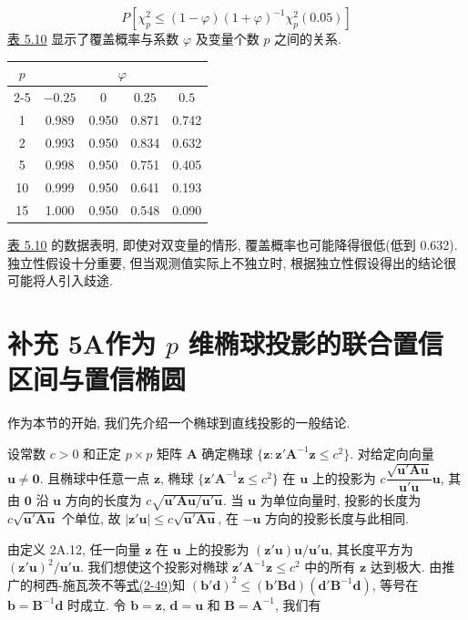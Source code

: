 \[
P\left[\chi_p^2\le(1-\varphi)(1+\varphi)^{-1}\chi_p^2(0.05)\right]
\]
\hyperref[tab:5.10]{表 5.10} 显示了覆盖概率与系数 $\varphi$ 及变量个数 $p$ 之间的关系.

\begin{mvtable}
\label{tab:5.10}
\begin{tabular}{ccccc}
\toprule
$p$ & \multicolumn{4}{c}{$\varphi$}\\
\cmidrule(lr){2-5}
& $-0.25$ & $0$ & $0.25$ & $0.5$\\
\midrule
1 & 0.989 & 0.950 & 0.871 & 0.742\\
2 & 0.993 & 0.950 & 0.834 & 0.632\\
5 & 0.998 & 0.950 & 0.751 & 0.405\\
10 & 0.999 & 0.950 & 0.641 & 0.193\\
15 & 1.000 & 0.950 & 0.548 & 0.090\\
\bottomrule
\end{tabular}
\end{mvtable}

\hyperref[tab:5.10]{表 5.10} 的数据表明, 即使对双变量的情形, 覆盖概率也可能降得很低(低到 0.632).
独立性假设十分重要, 但当观测值实际上不独立时, 根据独立性假设得出的结论很可能将人引入歧途.

\section*{补充 5A\quad 作为 $p$ 维椭球投影的联合置信区间与置信椭圆}
\label{sec:5.9}

作为本节的开始, 我们先介绍一个椭球到直线投影的一般结论.

 设常数 $c>0$ 和正定 $p\times p$ 矩阵 $\mathbf{A}$ 确定椭球 $\{\mathbf{z}:\mathbf{z}'\mathbf{A}^{-1}\mathbf{z}\le c^2\}$. 对给定向向量 $\mathbf{u}\ne\mathbf{0}$. 且椭球中任意一点 $\mathbf{z}$, 椭球 $\{\mathbf{z}'\mathbf{A}^{-1}\mathbf{z}\le c^2\}$ 在 $\mathbf{u}$ 上的投影为 $c\dfrac{\sqrt{\mathbf{u}'\mathbf{A}\mathbf{u}}}{\mathbf{u}'\mathbf{u}}\mathbf{u}$, 其由 $\mathbf{0}$ 沿 $\mathbf{u}$ 方向的长度为 $c\sqrt{\mathbf{u}'\mathbf{A}\mathbf{u}/\mathbf{u}'\mathbf{u}}$. 当 $\mathbf{u}$ 为单位向量时, 投影的长度为 $c\sqrt{\mathbf{u}'\mathbf{A}\mathbf{u}}$ 个单位, 故 $|\mathbf{z}'\mathbf{u}|\le c\sqrt{\mathbf{u}'\mathbf{A}\mathbf{u}}$, 在 $-\mathbf{u}$ 方向的投影长度与此相同.

\quad 由定义 2A.12, 任一向量 $\mathbf{z}$ 在 $\mathbf{u}$ 上的投影为 $(\mathbf{z}'\mathbf{u})\mathbf{u}/\mathbf{u}'\mathbf{u}$, 其长度平方为 $(\mathbf{z}'\mathbf{u})^2/\mathbf{u}'\mathbf{u}$. 我们想使这个投影对椭球 $\mathbf{z}'\mathbf{A}^{-1}\mathbf{z}\le c^2$ 中的所有 $\mathbf{z}$ 达到极大. 由推广的柯西-施瓦茨不等\hyperref[eq:2-49]{式(2-49)}知 $(\mathbf{b}'\mathbf{d})^2\le(\mathbf{b}'\mathbf{B}\mathbf{d})(\mathbf{d}'\mathbf{B}^{-1}\mathbf{d})$, 等号在 $\mathbf{b}=\mathbf{B}^{-1}\mathbf{d}$ 时成立. 令 $\mathbf{b}=\mathbf{z}$, $\mathbf{d}=\mathbf{u}$ 和 $\mathbf{B}=\mathbf{A}^{-1}$, 我们有

